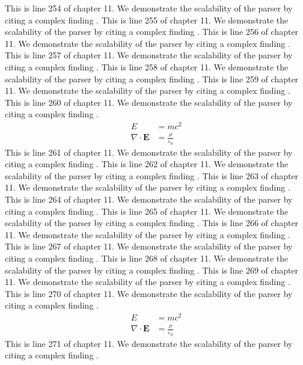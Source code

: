 This is line 254 of chapter 11. We demonstrate the scalability of the parser by citing a complex finding \cite{ref11_254}.
This is line 255 of chapter 11. We demonstrate the scalability of the parser by citing a complex finding \cite{ref11_255}.
This is line 256 of chapter 11. We demonstrate the scalability of the parser by citing a complex finding \cite{ref11_256}.
This is line 257 of chapter 11. We demonstrate the scalability of the parser by citing a complex finding \cite{ref11_257}.
This is line 258 of chapter 11. We demonstrate the scalability of the parser by citing a complex finding \cite{ref11_258}.
This is line 259 of chapter 11. We demonstrate the scalability of the parser by citing a complex finding \cite{ref11_259}.
This is line 260 of chapter 11. We demonstrate the scalability of the parser by citing a complex finding \cite{ref11_260}.
\begin{align*}
  E &= mc^2 \\
  \nabla \cdot \mathbf{E} &= \frac{\rho}{\varepsilon_0}
\end{align*}
This is line 261 of chapter 11. We demonstrate the scalability of the parser by citing a complex finding \cite{ref11_261}.
This is line 262 of chapter 11. We demonstrate the scalability of the parser by citing a complex finding \cite{ref11_262}.
This is line 263 of chapter 11. We demonstrate the scalability of the parser by citing a complex finding \cite{ref11_263}.
This is line 264 of chapter 11. We demonstrate the scalability of the parser by citing a complex finding \cite{ref11_264}.
This is line 265 of chapter 11. We demonstrate the scalability of the parser by citing a complex finding \cite{ref11_265}.
This is line 266 of chapter 11. We demonstrate the scalability of the parser by citing a complex finding \cite{ref11_266}.
This is line 267 of chapter 11. We demonstrate the scalability of the parser by citing a complex finding \cite{ref11_267}.
This is line 268 of chapter 11. We demonstrate the scalability of the parser by citing a complex finding \cite{ref11_268}.
This is line 269 of chapter 11. We demonstrate the scalability of the parser by citing a complex finding \cite{ref11_269}.
This is line 270 of chapter 11. We demonstrate the scalability of the parser by citing a complex finding \cite{ref11_270}.
\begin{align*}
  E &= mc^2 \\
  \nabla \cdot \mathbf{E} &= \frac{\rho}{\varepsilon_0}
\end{align*}
This is line 271 of chapter 11. We demonstrate the scalability of the parser by citing a complex finding \cite{ref11_271}.
